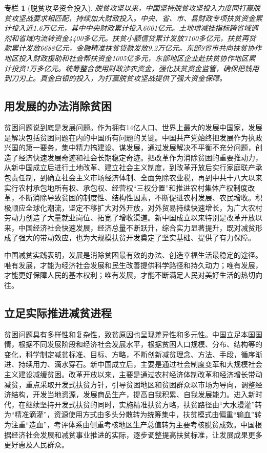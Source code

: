 \documentclass{ctexart}
\newtheorem{zhuanlan}{专栏}
\begin{document}
\begin{zhuanlan}[脱贫攻坚资金投入]
    脱贫攻坚以来，中国坚持脱贫攻坚投入力度同打赢脱贫攻坚战要求相匹配，持续加大财政投入。中央、省、市、县财政专项扶贫资金累计投入近1.6万亿元，其中中央财政累计投入6601亿元。土地增减挂指标跨省域调剂和省域内流转资金4400多亿元。扶贫小额信贷累计发放7100多亿元，扶贫再贷款累计发放6688亿元，金融精准扶贫贷款发放9.2万亿元。东部9省市共向扶贫协作地区投入财政援助和社会帮扶资金1005亿多元，东部地区企业赴扶贫协作地区累计投资1万多亿元。统筹整合使用财政涉农资金，强化扶贫资金监管，确保把钱用到刀刃上。真金白银的投入，为打赢脱贫攻坚战提供了强大资金保障。
    \label{col-12}
\end{zhuanlan}

\subsection{用发展的办法消除贫困}

贫困问题说到底是发展问题。作为拥有14亿人口、世界上最大的发展中国家，发展是解决包括贫困问题在内的中国所有问题的关键。中国共产党始终把发展作为执政兴国的第一要务，集中精力搞建设、谋发展，通过发展解决不平衡不充分问题，创造了经济快速发展奇迹和社会长期稳定奇迹。把改革作为消除贫困的重要推动力，从新中国成立后进行土地改革、建立社会主义制度，到改革开放后实行家庭联产承包责任制，到确立社会主义市场经济体制、全面免除农业税，再到中共十八大以来实行农村承包地所有权、承包权、经营权“三权分置”和推进农村集体产权制度改革，不断消除导致贫困的制度性、结构性因素，不断促进农村发展、农民增收。积极顺应全球化潮流，坚定不移扩大对外开放，对外贸易持续快速增长，为广大农村劳动力创造了大量就业岗位、拓宽了增收渠道。新中国成立以来特别是改革开放以来，中国经济社会快速发展，经济总量不断跃升，综合实力显著提升，既对减贫形成了强大的带动效应，也为大规模扶贫开发奠定了坚实基础、提供了有力保障。

中国减贫实践表明，发展是消除贫困最有效的办法、创造幸福生活最稳定的途径。唯有发展，才能为经济社会发展和民生改善提供科学路径和持久动力；唯有发展，才能更好保障人民的基本权利；唯有发展，才能不断满足人民对美好生活的热切向往。

\subsection{立足实际推进减贫进程}

贫困问题具有多样性和复杂性，致贫原因也呈现差异性和多元性。中国立足本国国情，根据不同发展阶段和经济社会发展水平，根据贫困人口规模、分布、结构等的变化，科学制定减贫标准、目标、方略，不断创新减贫理念、方法、手段，循序渐进、持续用力、滴水穿石。新中国成立后，主要是通过社会制度变革和大规模社会主义建设减缓贫困。改革开放以来，主要是通过农村经济体制改革和经济增长带动减贫，重点采取开发式扶贫方针，引导贫困地区和贫困群众以市场为导向，调整经济结构，开发当地资源，发展商品生产，提高自我积累、自我发展能力。进入新时代，在继续坚持开发式扶贫的同时，实施精准扶贫方略，扶贫路径由“大水漫灌”转为“精准滴灌”，资源使用方式由多头分散转为统筹集中，扶贫模式由偏重“输血”转为注重“造血”，考评体系由侧重考核地区生产总值转为主要考核脱贫成效。中国根据经济社会发展和减贫事业推进的实际，逐步调整提高扶贫标准，让发展成果更多更好惠及人民群众。
\end{document}
